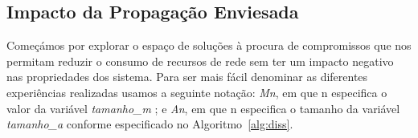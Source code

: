  

\subsection{Impacto da Propagação Enviesada}
\label{sec:evalDiss}
Começámos por explorar o espaço de soluções à procura de compromissos que nos permitam reduzir o consumo de recursos de rede sem ter um impacto negativo nas propriedades dos sistema.
Para ser mais fácil denominar as diferentes experiências realizadas usamos a seguinte notação: \textsl{Mn}, em que n especifica o valor da variável \textsl{tamanho\_m} ; e \textsl{An}, em que n especifica o tamanho da variável \textsl{tamanho\_a} conforme especificado no Algoritmo~\ref{alg:diss}.



